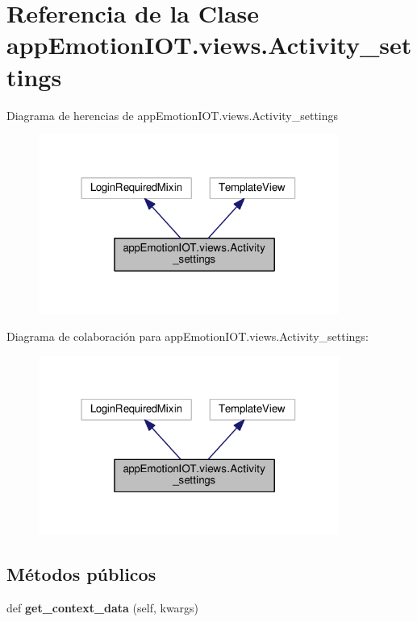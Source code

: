 \hypertarget{classappEmotionIOT_1_1views_1_1Activity__settings}{}\section{Referencia de la Clase app\+Emotion\+I\+O\+T.\+views.\+Activity\+\_\+settings}
\label{classappEmotionIOT_1_1views_1_1Activity__settings}


Diagrama de herencias de app\+Emotion\+I\+O\+T.\+views.\+Activity\+\_\+settings
\nopagebreak
\begin{figure}[H]
\begin{center}
\leavevmode
\includegraphics[width=279pt]{classappEmotionIOT_1_1views_1_1Activity__settings__inherit__graph}
\end{center}
\end{figure}


Diagrama de colaboración para app\+Emotion\+I\+O\+T.\+views.\+Activity\+\_\+settings\+:
\nopagebreak
\begin{figure}[H]
\begin{center}
\leavevmode
\includegraphics[width=279pt]{classappEmotionIOT_1_1views_1_1Activity__settings__coll__graph}
\end{center}
\end{figure}
\subsection*{Métodos públicos}
\begin{DoxyCompactItemize}
\item 
def {\bfseries get\+\_\+context\+\_\+data} (self, kwargs)\hypertarget{classappEmotionIOT_1_1views_1_1Activity__settings_a488fddee5eb2cb40070ab6816804b9b6}{}\label{classappEmotionIOT_1_1views_1_1Activity__settings_a488fddee5eb2cb40070ab6816804b9b6}

\end{DoxyCompactItemize}
